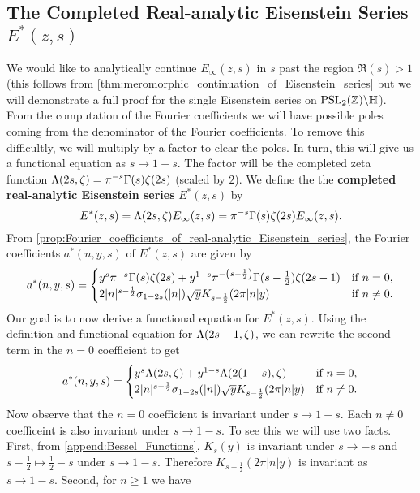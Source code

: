     \subsection*{The Completed Real-analytic Eisenstein Series \texorpdfstring{$E^{\ast}(z,s)$}{E^{\ast}(z,s)}}
      We would like to analytically continue $E_{\infty}(z,s)$ in $s$ past the region $\Re(s) > 1$ (this follows from \cref{thm:meromorphic_continuation_of_Eisenstein_series} but we will demonstrate a full proof for the single Eisenstein series on $\mathrm{PSL}_{2}(\mathbb{Z})\backslash\mathbb{H}$). From the computation of the Fourier coefficients we will have possible poles coming from the denominator of the Fourier coefficients. To remove this difficultly, we will multiply by a factor to clear the poles. In turn, this will give us a functional equation as $s \to 1-s$. The factor will be the completed zeta function $\Lambda(2s,\zeta) = \pi^{-s}\Gamma(s)\zeta(2s)$ (scaled by $2$). We define the the \textbf{completed real-analytic Eisenstein series} $E^{\ast}(z,s)$ by
      \[
        E^{\ast}(z,s) = \Lambda(2s,\zeta)E_{\infty}(z,s) = \pi^{-s}\Gamma(s)\zeta(2s)E_{\infty}(z,s).
      \]
      From \cref{prop:Fourier_coefficients_of_real-analytic_Eisenstein_series}, the Fourier coefficients $a^{\ast}(n,y,s)$ of $E^{\ast}(z,s)$ are given by
      \[
        a^{\ast}(n,y,s) = \begin{cases} y^{s}\pi^{-s}\Gamma(s)\zeta(2s)+y^{1-s}\pi^{-\left(s-\frac{1}{2}\right)}\Gamma(s-\frac{1}{2})\zeta(2s-1) & \text{if $n = 0$}, \\ 2|n|^{s-\frac{1}{2}}\sigma_{1-2s}(|n|)\sqrt{y}K_{s-\frac{1}{2}}(2\pi|n|y) & \text{if $n \neq 0$}. \end{cases}
      \]
      Our goal is to now derive a functional equation for $E^{\ast}(z,s)$. Using the definition and functional equation for $\Lambda(2s-1,\zeta)$, we can rewrite the second term in the $n = 0$ coefficient to get
      \begin{equation}\label{equ:Fourier_coefficients_for_completed_real-analytic_Eisenstein_series}
        a^{\ast}(n,y,s) = \begin{cases} y^{s}\Lambda(2s,\zeta)+y^{1-s}\Lambda(2(1-s),\zeta) & \text{if $n = 0$}, \\ 2|n|^{s-\frac{1}{2}}\sigma_{1-2s}(|n|)\sqrt{y}K_{s-\frac{1}{2}}(2\pi|n|y) & \text{if $n \neq 0$}. \end{cases}
      \end{equation}
      Now observe that the $n = 0$ coefficient is invariant under $s \to 1-s$. Each $n \neq 0$ coefficeint is also invariant under $s \to 1-s$. To see this we will use two facts. First, from \cref{append:Bessel_Functions}, $K_{s}(y)$ is invariant under $s \to -s$ and $s-\frac{1}{2} \mapsto \frac{1}{2}-s$ under $s \to 1-s$. Therefore $K_{s-\frac{1}{2}}(2\pi|n|y)$ is invariant as $s \to 1-s$. Second, for $n \ge 1$ we have
